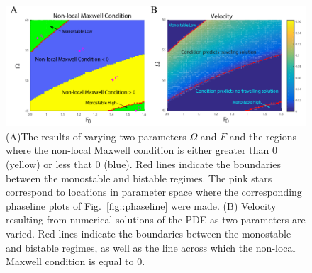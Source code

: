 \begin{figure}[h]
\centering
\captionsetup{width=.9\linewidth}
\includegraphics[width=6in]{Project2/figs/MM_results.pdf}
\caption{(A)The results of varying two parameters $\Omega$ and $F$ and the regions where the non-local Maxwell condition is either greater than $0$ (yellow) or less that $0$ (blue). Red lines indicate the boundaries between the monostable and bistable regimes. The pink stars correspond to locations in parameter space where the corresponding phaseline plots of Fig.~\ref{fig::phaseline} were made.  (B) Velocity resulting from numerical solutions of the PDE as two parameters are varied. Red lines indicate the boundaries between the monostable and bistable regimes, as well as the line across which the non-local Maxwell condition is equal to $0$.}
\label{fig::NLMC}
\end{figure}




